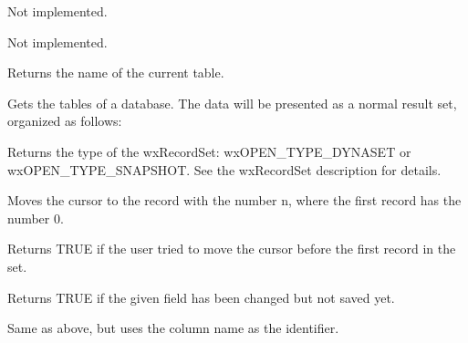 Not implemented.
  


Not implemented.



Returns the name of the current table.
  


Gets the tables of a database. The data will be presented as a normal result
set, organized as follows:

\begin{twocollist}\itemsep=0pt
\end{twocollist}



Returns the type of the wxRecordSet: wxOPEN\_TYPE\_DYNASET or
wxOPEN\_TYPE\_SNAPSHOT. See the wxRecordSet description for details.



Moves the cursor to the record with the number n, where  the first record
has the number 0.
  


Returns TRUE if the user tried to move the cursor before the first record
in the set.



Returns TRUE if the given field has been changed but not saved yet.


Same as above, but uses the column name as the identifier.

